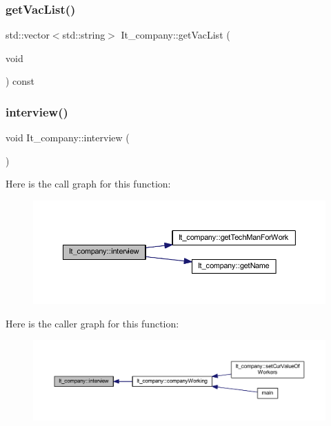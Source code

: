 \subsubsection{\texorpdfstring{get\+Vac\+List()}{getVacList()}}
{\footnotesize\ttfamily std\+::vector$<$std\+::string$>$ It\+\_\+company\+::get\+Vac\+List (\begin{DoxyParamCaption}\item[{void}]{ }\end{DoxyParamCaption}) const\hspace{0.3cm}{\ttfamily [inline]}}

\hypertarget{class_it__company_a0d05d1b25d00b221bbb66e57332dea08}{}\label{class_it__company_a0d05d1b25d00b221bbb66e57332dea08} 
\subsubsection{\texorpdfstring{interview()}{interview()}}
{\footnotesize\ttfamily void It\+\_\+company\+::interview (\begin{DoxyParamCaption}{ }\end{DoxyParamCaption})\hspace{0.3cm}{\ttfamily [private]}}

Here is the call graph for this function\+:
\nopagebreak
\begin{figure}[H]
\begin{center}
\leavevmode
\includegraphics[width=350pt]{class_it__company_a0d05d1b25d00b221bbb66e57332dea08_cgraph}
\end{center}
\end{figure}
Here is the caller graph for this function\+:
\nopagebreak
\begin{figure}[H]
\begin{center}
\leavevmode
\includegraphics[width=350pt]{class_it__company_a0d05d1b25d00b221bbb66e57332dea08_icgraph}
\end{center}
\end{figure}
\hypertarget{class_it__company_ae83add85a00be1e24cdce48aa72678de}{}\label{class_it__company_ae83add85a00be1e24cdce48aa72678de} 
